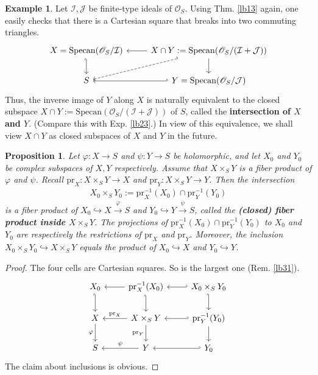 \documentclass[12pt,b5paper,notitlepage]{report}
\theoremstyle{definition}
\newtheorem{eg}[df]{Example}
\theoremstyle{plain}
\newtheorem{pp}[df]{Proposition}
\newcommand{\mc}{\mathcal}
\newcommand{\scr}{\mathscr}
\newcommand{\pr}{\mathrm {pr}}
\newcommand{\Specan}{\mathrm{Specan}}
\numberwithin{equation}{section}
\begin{document}
\begin{eg}
Let $\mc I,\mc J$ be finite-type ideals of $\scr O_S$. Using Thm. \ref{lb13} again, one easily checks that there is a  Cartesian square that breaks into two commuting triangles.
\begin{equation}
\begin{tikzcd}
X=\Specan(\scr O_S/\mc I) \arrow[d,hook'] & X\cap Y:=\Specan(\scr O_S/(\mc I+\mc J)) \arrow[d] \arrow[l] \arrow[ld, dashed, hook']\\
S           &Y= \Specan(\scr O_S/\mc J) \arrow[l, hook']          
\end{tikzcd}
\end{equation}
Thus, the inverse image of $Y$ along $X$ is naturally equivalent to the closed subspace $X\cap Y:=\Specan(\scr O_S/(\mc I+\mc J))$ of $S$, called the \textbf{intersection of $X$ and $Y$}.  (Compare this with Exp. \ref{lb23}.) In view of this equivalence, we shall view $X\cap Y$ as closed subspaces of $X$ and $Y$ in the future.
\end{eg}



\begin{pp}\label{lb32}
Let $\varphi:X\rightarrow S$ and $\psi:Y\rightarrow S$ be holomorphic, and let $X_0$ and $Y_0$ be complex subspaces of $X,Y$ respectively. Assume that $X\times_SY$ is a fiber product of $\varphi$ and $\psi$. Recall $\pr_X:X\times_SY\rightarrow X$ and $\pr_Y:X\times_SY\rightarrow Y$. Then the intersection
\begin{align*}
X_0\times_S Y_0:=\pr_X^{-1}(X_0)\cap \pr_Y^{-1}(Y_0)
\end{align*}
is a fiber product of $X_0\hookrightarrow X\xrightarrow{\varphi}S$ and $Y_0\hookrightarrow Y\xrightarrow{\psi}S$, called the \textbf{(closed) fiber product inside $X\times_SY$}.  The projections of $\pr_X^{-1}(X_0)\cap\pr_Y^{-1}(Y_0)$ to $X_0$ and $Y_0$ are respectively the restrictions of $\pr_X$ and $\pr_Y$. Moreover, the inclusion $X_0\times_S Y_0\hookrightarrow X\times_SY$ equals the product of $X_0\hookrightarrow X$ and $Y_0\hookrightarrow Y$.
\end{pp}


\begin{proof}
The four cells are Cartesian squares. So is the largest one (Rem. \ref{lb31}).
\begin{equation}
\begin{tikzcd}
X_0 \arrow[d, hook']    & \pr_X^{-1}(X_0) \arrow[l] \arrow[d, hook']   & X_0\times_S Y_0 \arrow[l, hook'] \arrow[d, hook'] \\
X \arrow[d, "\varphi"'] & X\times_SY \arrow[l,"\pr_X"'] \arrow[d,"\pr_Y"'] & \pr_Y^{-1}(Y_0) \arrow[l, hook'] \arrow[d]        \\
S                       & Y \arrow[l, "\psi"']           & Y_0 \arrow[l, hook']               
\end{tikzcd}
\end{equation}
The claim about inclusions is obvious.
\end{proof}
\end{document}
